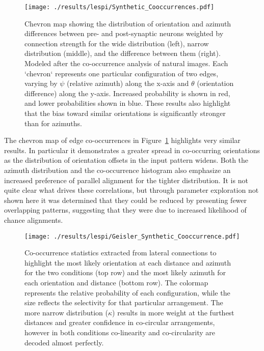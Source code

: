 \begin{figure}
	\centering
        \texttt{[image: ./results/lespi/Synthetic\_Cooccurrences.pdf]}
	\caption[Chevron map showing the distribution of orientation and
      azimuth differences between pre- and post-synaptic
      neurons.]{Chevron map showing the distribution of orientation
      and azimuth differences between pre- and post-synaptic neurons
      weighted by connection strength for the wide distribution
      (left), narrow distribution (middle), and the difference between
      them (right). Modeled after the \cite{Perrinet2015}
      co-occurrence analysis of natural images. Each `chevron`
      represents one particular configuration of two edges, varying by
      $\psi$ (relative azimuth) along the x-axis and $\theta$
      (orientation difference) along the y-axis. Increased probability
      is shown in red, and lower probabilities shown in blue. These
      results also highlight that the bias toward similar orientations
      is significantly stronger than for azimuths.}
	\label{SyntheticCooccurrence}
\end{figure}

The chevron map of edge co-occurrences in
Figure~\ref{SyntheticCooccurrence} highlights very similar results. In
particular it demonstrates a greater spread in co-occurring
orientations as the distribution of orientation offsets in the input
pattern widens. Both the azimuth distribution and the co-occurrence
histogram also emphasize an increased preference of parallel alignment
for the tighter distribution. It is not quite clear what drives these
correlations, but through parameter exploration not shown here it was
determined that they could be reduced by presenting fewer overlapping
patterns, suggesting that they were due to increased likelihood of
chance alignments.

\begin{figure}
	\centering
    \texttt{[image: ./results/lespi/Geisler\_Synthetic\_Cooccurrence.pdf]}
	\caption{Co-occurrence statistics extracted from lateral
      connections to highlight the most likely orientation at each
      distance and azimuth for the two conditions (top row) and the
      most likely azimuth for each orientation and distance (bottom
      row). The colormap represents the relative probability of each
      configuration, while the size reflects the selectivity for that
      particular arrangement. The more narrow distribution ($\kappa$)
      results in more weight at the furthest distances and greater
      confidence in co-circular arrangements, however in both
      conditions co-linearity and co-circularity are decoded almost
      perfectly.}
	\label{SyntheticGeisler}
\end{figure}

